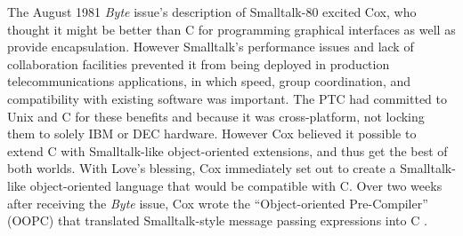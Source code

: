 \documentclass[acmsmall]{acmart}\settopmatter{}
\begin{document}
The August 1981 \emph{Byte} issue's description of Smalltalk-80 excited Cox, who thought it might be better than C for programming graphical interfaces as well as provide encapsulation. However Smalltalk's performance issues and lack of collaboration facilities prevented it from being deployed in production telecommunications applications, in which speed, group coordination, and compatibility with existing software was important. The PTC had committed to Unix and C for these benefits and because it was cross-platform, not locking them to solely IBM or DEC hardware. However Cox believed it possible to extend C with Smalltalk-like object-oriented extensions, and thus get the best of both worlds. With Love's blessing, Cox immediately set out to create a Smalltalk-like object-oriented language that would be compatible with C. Over two weeks after receiving the \emph{Byte} issue, Cox wrote the ``Object-oriented Pre-Compiler'' (OOPC) that translated Smalltalk-style message passing expressions into C \citep{cox_object_1983}.
\end{document}
